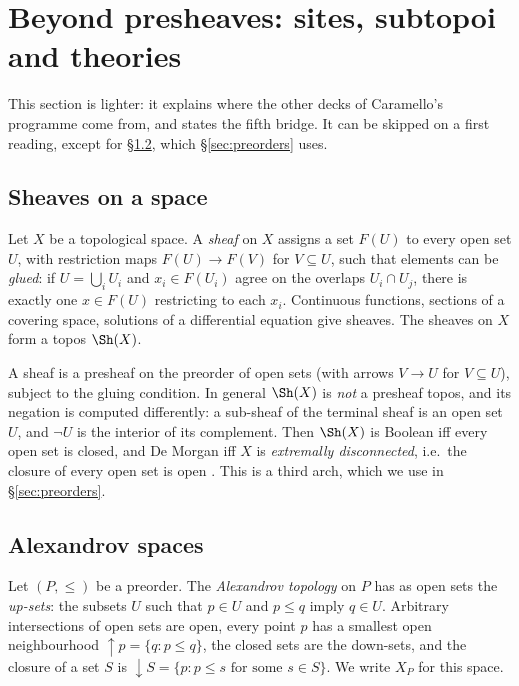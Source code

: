 \section{Beyond presheaves: sites, subtopoi and theories}\label{sec:sites}

This section is lighter: it explains where the other decks of Caramello's programme come from, and states the fifth bridge. It can be skipped on a first reading, except for \S\ref{ssec:alexandrov}, which \S\ref{sec:preorders} uses.

\subsection{Sheaves on a space}

Let $X$ be a topological space. A \emph{sheaf} on $X$ assigns a set $F(U)$ to every open set $U$, with restriction maps $F(U)\to F(V)$ for $V\subseteq U$, such that elements can be \emph{glued}: if $U = \bigcup_i U_i$ and $x_i\in F(U_i)$ agree on the overlaps $U_i\cap U_j$, there is exactly one $x\in F(U)$ restricting to each $x_i$. Continuous functions, sections of a covering space, solutions of a differential equation give sheaves. The sheaves on $X$ form a topos $\Sh(X)$.

A sheaf is a presheaf on the preorder of open sets (with arrows $V\to U$ for $V\subseteq U$), subject to the gluing condition. In general $\Sh(X)$ is \emph{not} a presheaf topos, and its negation is computed differently: a sub-sheaf of the terminal sheaf is an open set $U$, and $\neg U$ is the interior of its complement. Then $\Sh(X)$ is Boolean iff every open set is closed, and De Morgan iff $X$ is \emph{extremally disconnected}, i.e.\ the closure of every open set is open \cite{johnstone-demorgan}. This is a third arch, which we use in \S\ref{sec:preorders}.

\subsection{Alexandrov spaces}\label{ssec:alexandrov}

Let $(P,\le)$ be a preorder. The \emph{Alexandrov topology} on $P$ has as open sets the \emph{up-sets}: the subsets $U$ such that $p\in U$ and $p\le q$ imply $q\in U$. Arbitrary intersections of open sets are open, every point $p$ has a smallest open neighbourhood $\uparrow p = \{q : p\le q\}$, the closed sets are the down-sets, and the closure of a set $S$ is $\downarrow S = \{p : p\le s\text{ for some }s\in S\}$. We write $X_P$ for this space.

